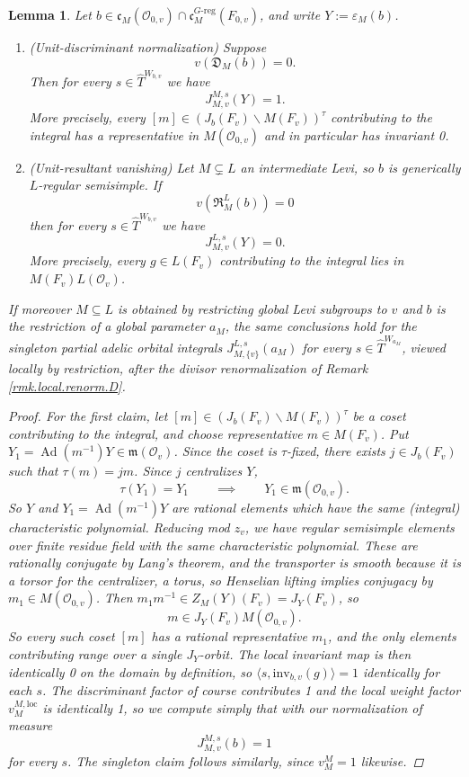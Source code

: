 \documentclass[openany]{amsbook}
\newtheorem{lemma}[theorem]{Lemma}
\theoremstyle{definition}
\theoremstyle{remark}
\numberwithin{equation}{section}
\renewcommand{\O}{\mathcal{O}}
\renewcommand{\epsilon}{\varepsilon}
\renewcommand{\-}{\operatorname{-}}
\newcommand{\on}[1]{\operatorname{#1}}
\newcommand{\fm}{\mathfrak{m}}
\newcommand{\fc}{\mathfrak{c}}
\renewcommand{\fm}{\mathfrak{m}}
\newcommand{\fD}{\mathfrak{D}}
\newcommand{\fR}{\mathfrak{R}}
\newcommand{\Greg}{G\text{-reg}}
\newcommand{\Ad}{\on{Ad}}
\newcommand{\inv}{\mathrm{inv}}
\newcommand{\loc}{\mathrm{loc}}
\begin{document}
\begin{lemma}\label{lem.unit.disc.result.vanish}
    Let $b \in \fc_M(\O_{0,v}) \cap \fc_M^{\Greg}(F_{0,v})$, and write $Y := \epsilon_M(b)$.
    \begin{enumerate} 
    \item (Unit-discriminant normalization) Suppose
    $$
        v(\fD_M(b)) = 0.
    $$
    Then for every $s \in \widehat{T}^{W_{b,v}}$ we have
    $$
        J_{M,v}^{M,s}(Y) = 1.
    $$
    More precisely, every $[m] \in (J_b(F_v) \backslash M(F_v))^{\tau}$ contributing to the integral has a representative in $M(\O_{0,v})$ and in particular has invariant 0.
    \item (Unit-resultant vanishing) Let $M \subsetneq L$ an intermediate Levi, so $b$ is generically $L$-regular semisimple. If
    $$
        v(\fR_M^L(b)) = 0
    $$
    then for every $s \in \widehat{T}^{W_{b,v}}$ we have
    $$
        J_{M,v}^{L,s}(Y) = 0.
    $$
    More precisely, every $g \in L(F_v)$ contributing to the integral lies in $M(F_v) L(\O_v)$.
    \end{enumerate}
    If moreover $M \subseteq L$ is obtained by restricting global Levi subgroups to $v$ and $b$ is the restriction of a global parameter $a_M$, the same conclusions hold for the singleton partial adelic orbital integrals $J_{M, \{v\}}^{L,s}(a_M)$ for every $s \in \widehat{T}^{W_{a_M}}$, viewed locally by restriction, after the divisor renormalization of Remark \ref{rmk.local.renorm.D}.
    \begin{proof}
        For the first claim, let $[m] \in (J_b(F_v) \backslash M(F_v))^{\tau}$ be a coset contributing to the integral, and choose representative $m \in M(F_v)$. Put $Y_1 = \Ad(m^{-1})Y \in \fm(\O_v)$. Since the coset is $\tau$-fixed, there exists $j \in J_b(F_v)$ such that $\tau(m) = jm$. Since $j$ centralizes $Y$,
        $$
            \tau(Y_1) = Y_1 \qquad \implies \qquad Y_1 \in \fm(\O_{0,v}).
        $$
        So $Y$ and $Y_1 = \Ad(m^{-1})Y$ are rational elements which have the same (integral) characteristic polynomial. Reducing mod $z_v$, we have regular semisimple elements over finite residue field with the same characteristic polynomial. These are rationally conjugate by Lang's theorem, and the transporter is smooth because it is a torsor for the centralizer, a torus, so Henselian lifting implies conjugacy by $m_1 \in M(\O_{0,v})$. Then $m_1 m^{-1} \in Z_M(Y)(F_{v}) = J_Y(F_{v})$, so 
        $$
            m \in J_Y(F_{v}) M(\O_{0,v}).
        $$
        So every such coset $[m]$ has a rational representative $m_1$, and the only elements contributing range over a single $J_Y$-orbit. The local invariant map is then identically 0 on the domain by definition, so $\langle s, \inv_{b,v}(g)\rangle = 1$ identically for each $s$. The discriminant factor of course contributes 1 and the local weight factor $v_M^{M,\loc}$ is identically 1, so we compute simply that with our normalization of measure
        $$
            J_{M,v}^{M,s}(b) = 1
        $$
        for every $s$. The singleton claim follows similarly, since $v_M^M = 1$ likewise.


\end{proof}
\end{lemma}
\end{document}
